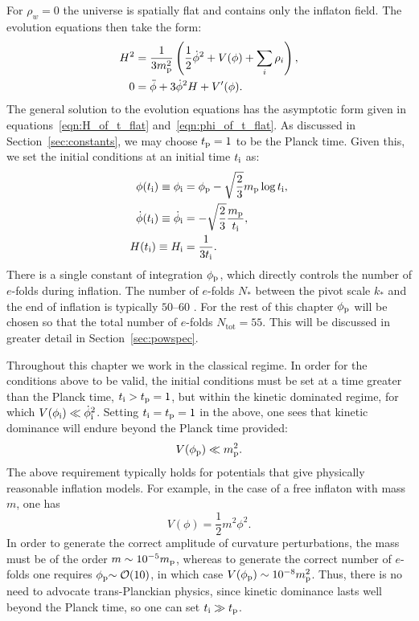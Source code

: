 For \(\rho_w=0\) the universe is spatially flat and contains only the inflaton field. The evolution equations then take the form:
%
\begin{align}
  H^2 
  &= 
  \frac{1}{3m_{\mathrm{p}}^2}
  \left(\frac{1}{2}\dot{\phi}^2 + V(\phi) + \sum_i\rho_i\right),
  \label{eqn:Friedmann_eq} 
  \\
  0
  &= 
  \ddot{\phi} +3\dot{\phi}^2H + V^\prime(\phi).
  \label{eqn:Motion_eq_Scalar}
\end{align}
%
The general solution to the evolution equations has the asymptotic form given in equations~\eqref{eqn:H_of_t_flat} and~\eqref{eqn:phi_of_t_flat}. As discussed in Section~\ref{sec:constants}, we may choose \(t_{\mathrm{p}}=1\) to be the Planck time. Given this, we set the initial conditions at an initial time \(t_{\mathrm{i}}\) as:
%
\begin{align}
  \phi(t_{\mathrm{i}}) \equiv \phi_{\mathrm{i}}
  &= 
  \phi_{\mathrm{p}} - \sqrt{\frac{2}{3}}m_{\mathrm{p}}\log t_{\mathrm{i}}, 
  \label{eqn:phi_ic}
  \\
  \dot\phi(t_{\mathrm{i}}) 
  \equiv 
  \dot\phi_{\mathrm{i}}
  &= 
  -\sqrt{\frac{2}{3}}\frac{m_{\mathrm{p}}}{t_{\mathrm{i}}}, 
  \label{eqn:phid_ic}
  \\
  H(t_{\mathrm{i}}) 
  \equiv 
  H_{\mathrm{i}}
  &= 
  \frac{1}{3t_{\mathrm{i}}}. 
  \label{eqn:H_ic}
\end{align}
There is a single constant of integration \(\phi_{\mathrm{p}}\), which directly controls the number of \(e\)-folds during inflation. The number of \(e\)-folds \(N_*\) between the pivot scale \(k_*\) and the end of inflation is typically \(50\)--\(60\) \citep{planck_collaboration_planck_2013-1}. For the rest of this chapter \(\phi_{\mathrm{p}}\) will be chosen so that the total number of \(e\)-folds \(N_\mathrm{tot}=55\). This will be discussed in greater detail in Section~\ref{sec:powspec}.

Throughout this chapter we work in the classical regime. In order for the conditions above to be valid, the initial conditions must be set at a time greater than the Planck time, \(t_{\mathrm{i}} >t_{\mathrm{p}}=1\), but within the kinetic dominated regime, for which \(V(\phi_{\mathrm{i}}) \ll \dot\phi_{\mathrm{i}}^2\). Setting \(t_{\mathrm{i}}=t_{\mathrm{p}}=1\) in the above, one sees that kinetic dominance will endure beyond the Planck time provided:
%
\begin{equation}
  V(\phi_{\mathrm{p}}) \ll m_{\mathrm{p}}^2.
\end{equation}
%
The above requirement typically holds for potentials that give physically reasonable inflation models. For example, in the case of a free inflaton with mass \(m\), one has \[ V(\phi) = \frac{1}{2}m^2 \phi^2.\] In order to generate the correct amplitude of curvature perturbations, the mass must be of the order \(m\sim10^{-5}m_{\mathrm{p}}\), whereas to generate the correct number of \(e\)-folds one requires \(\phi_{\mathrm{p}}{\sim\mathcal{O}{\left(10\right)}}\), in which case \(V(\phi_{\mathrm{p}}) \sim 10^{-8} m_{\mathrm{p}}^2\).  Thus, there is no need to advocate trans-Planckian physics, since kinetic dominance lasts well beyond the Planck time, so one can set \(t_{\mathrm{i}} \gg t_{\mathrm{p}}\).


